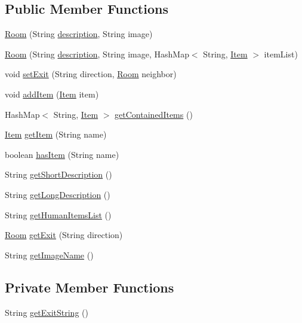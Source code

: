\subsection*{Public Member Functions}
\begin{DoxyCompactItemize}
\item 
\hyperlink{classRoom_a2cdcbb3d86746330a5a01c7fae4de02c}{Room} (String \hyperlink{classRoom_a2d7ecf802690a6b13750ca6fa6882d77}{description}, String image)
\item 
\hyperlink{classRoom_a05e162f8831368304aa193ad5a05750c}{Room} (String \hyperlink{classRoom_a2d7ecf802690a6b13750ca6fa6882d77}{description}, String image, Hash\-Map$<$ String, \hyperlink{classItem}{Item} $>$ item\-List)
\item 
void \hyperlink{classRoom_ae4bc6837f331b5249beb0651fc277018}{set\-Exit} (String direction, \hyperlink{classRoom}{Room} neighbor)
\item 
void \hyperlink{classRoom_a0b4fcc1c1c04e60efa7ae5f82ea37157}{add\-Item} (\hyperlink{classItem}{Item} item)
\item 
Hash\-Map$<$ String, \hyperlink{classItem}{Item} $>$ \hyperlink{classRoom_a4d50f61fe592736e56e9e083b124ff83}{get\-Contained\-Items} ()
\item 
\hyperlink{classItem}{Item} \hyperlink{classRoom_a9b53c8d9f87f4a6d9cc954aeb744d1a2}{get\-Item} (String name)
\item 
boolean \hyperlink{classRoom_ad779b367b26018c9f343ca3044c4b54f}{has\-Item} (String name)
\item 
String \hyperlink{classRoom_a85e561bc5fa9d9c965300e9ad264b02a}{get\-Short\-Description} ()
\item 
String \hyperlink{classRoom_a23a25854d7544fb0b41190a4d6bd1322}{get\-Long\-Description} ()
\item 
String \hyperlink{classRoom_ab8a87ad306f77a936873094b479bcde8}{get\-Human\-Items\-List} ()
\item 
\hyperlink{classRoom}{Room} \hyperlink{classRoom_a384ab8c844e5775f87de24d6c470637e}{get\-Exit} (String direction)
\item 
String \hyperlink{classRoom_a8177668df4d8be718812934673c42649}{get\-Image\-Name} ()
\end{DoxyCompactItemize}
\subsection*{Private Member Functions}
\begin{DoxyCompactItemize}
\item 
String \hyperlink{classRoom_a2ccc382c07890a9827be232767eb98a0}{get\-Exit\-String} ()
\end{DoxyCompactItemize}
